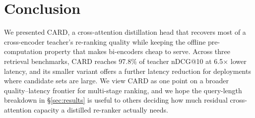 \section{Conclusion}
\label{sec:conclusion}

We presented CARD, a cross-attention distillation head that recovers most of
a cross-encoder teacher's re-ranking quality while keeping the offline
pre-computation property that makes bi-encoders cheap to serve. Across three
retrieval benchmarks, CARD reaches 97.8\% of teacher nDCG@10 at 6.5$\times$
lower latency, and its smaller variant offers a further latency reduction
for deployments where candidate sets are large. We view CARD as one point on
a broader quality--latency frontier for multi-stage ranking, and we hope the
query-length breakdown in \S\ref{sec:results} is useful to others deciding
how much residual cross-attention capacity a distilled re-ranker actually
needs.
